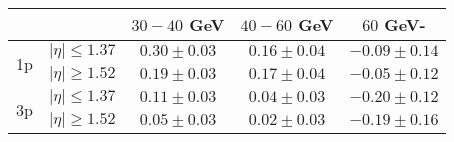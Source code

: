 \centering
\begin{tabular}{|c|c|c|c|c|} \hline
                  &  & $30-40$ GeV & $40-60$ GeV & $60$ GeV-  \\ \hline
\multirow{2}{*}{1p} &$\lvert \eta \rvert \leq 1.37$ & $0.30\pm0.03$ & $0.16\pm0.04$ & $-0.09\pm0.14$\\\cline{2-5}
                    &$\lvert \eta \rvert \geq 1.52$ & $0.19\pm0.03$ & $0.17\pm0.04$ & $-0.05\pm0.12$\\\hline 
\multirow{2}{*}{3p} &$\lvert \eta \rvert \leq 1.37$ & $0.11\pm0.03$ & $0.04\pm0.03$ & $-0.20\pm0.12$\\\cline{2-5}
                    &$\lvert \eta \rvert \geq 1.52$ & $0.05\pm0.03$ & $0.02\pm0.03$ & $-0.19\pm0.16$\\\hline  
\end{tabular}